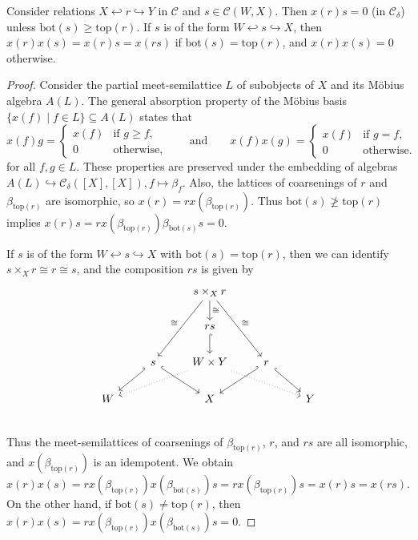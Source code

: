 \documentclass[11pt]{amsart}
\theoremstyle{definition}
\theoremstyle{remark}
\newcommand\cC{\mathcal C}
\renewcommand\:\colon
\renewcommand\:\colon
\newcommand\topp{\mathrm{top}}
\newcommand\bott{\mathrm{bot}}
\begin{document}
\begin{proposition} \label{p:moebius-property}
    Consider relations $X \hookleftarrow r \hookrightarrow Y$ in $\cC$ and $s \in
    \cC(W, X)$. Then $x(r) s = 0$ (in $\cC_\delta$) unless $\bott(s) \geqslant \topp(r)$. If
    $s$ is of the form $W \hookleftarrow s \hookrightarrow X$, then $x(r)
    x(s) = x(r) s = x(rs)$ if $\bott(s) = \topp(r)$, and $x(r) x(s) = 0$
    otherwise.
\end{proposition}
\begin{proof}
    Consider the partial meet-semilattice $L$ of subobjects of $X$ and its Möbius
    algebra $A(L)$. The general absorption property of the Möbius basis $\{x(f) \mid f \in L\} \subseteq A(L)$ states that
    \[
        x(f) g = \begin{cases}
            x(f) & \text{if } g \geqslant f, \\
            0 & \text{otherwise},
        \end{cases} \qquad\text{and}\qquad
        x(f) x(g) = \begin{cases}
            x(f) & \text{if } g = f, \\
            0 & \text{otherwise}.
        \end{cases}
    \]
    for all $f, g \in L$. These properties are preserved under the
    embedding of algebras $A(L) \hookrightarrow \cC_\delta([X], [X]), f \mapsto
    \beta_f$. Also, the lattices of coarsenings of $r$ and
    $\beta_{\topp(r)}$ are isomorphic, so $x(r) = r x(\beta_{\topp(r)})$.
    Thus $\bott(s) \not\geqslant \topp(r)$ implies $x(r) s = r
    x(\beta_{\topp(r)}) \beta_{\bott(s)} s = 0$.

    If $s$ is of the form $W \hookleftarrow s \hookrightarrow X$ with
    $\bott(s) = \topp(r)$, then we can identify $s \times_X r \cong r \cong
    s$, and the composition $rs$ is given by
    \[\begin{tikzcd}
        && s \times_X r \arrow[swap,]{ldd}{\cong} \arrow{rdd}{\cong} \arrow{d}{\cong} && \\
        && rs \arrow[hook]{d} && \\
        & s \arrow[hook']{ld} \arrow[hook]{rd} & W \times Y \arrow[dotted]{lld}\arrow[dotted]{rrd} & r \arrow[hook']{ld} \arrow[hook]{rd} & \\
        W && X && Y \\
    \end{tikzcd}\]
    Thus the meet-semilattices of coarsenings of $\beta_{\topp(r)}$, $r$,
    and $rs$ are all isomorphic, and $x(\beta_{\topp(r)})$ is an
    idempotent. We obtain
    \[
        x(r) x(s) = r x(\beta_{\topp(r)}) x(\beta_{\bott(s)}) s = r x(\beta_{\topp(r)}) s = x(r) s = x(rs).
    \]
    On the other hand, if $\bott(s) \neq \topp(r)$, then $x(r) x(s) = r
    x(\beta_{\topp(r)}) x(\beta_{\bott(s)}) s = 0$.
\end{proof}
\end{document}

